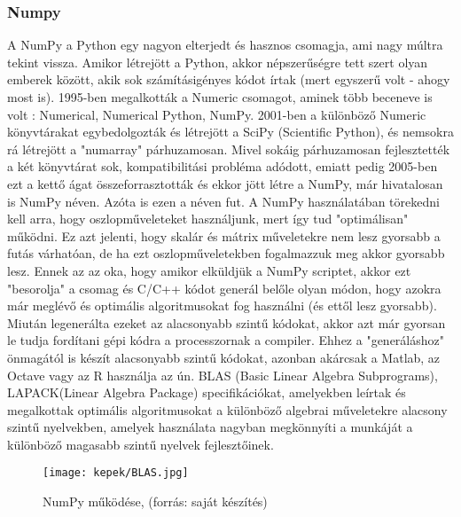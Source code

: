 \documentclass{article}
\theoremstyle{definition}
\theoremstyle{theorem}
\begin{document}
\subsubsection{Numpy}
A NumPy a Python egy nagyon elterjedt és hasznos csomagja, ami nagy múltra tekint vissza. Amikor létrejött a Python, akkor  népszerűségre tett szert olyan emberek között, akik sok számításigényes kódot írtak (mert egyszerű volt - ahogy most is). 1995-ben megalkották a Numeric csomagot, aminek több beceneve is volt : Numerical, Numerical Python, NumPy. 2001-ben a különböző Numeric könyvtárakat egybedolgozták és létrejött a SciPy (Scientific Python), és nemsokra rá létrejött a "numarray" párhuzamosan. Mivel sokáig párhuzamosan fejlesztették a két könyvtárat sok, kompatibilitási probléma adódott, emiatt pedig 2005-ben ezt a kettő ágat összeforrasztották és ekkor jött létre a NumPy, már hivatalosan is NumPy néven. Azóta is ezen a néven fut. A NumPy használatában törekedni kell arra, hogy oszlopműveleteket használjunk, mert így tud "optimálisan" működni. Ez azt jelenti, hogy skalár és mátrix műveletekre nem lesz gyorsabb a futás várhatóan, de ha ezt oszlopműveletekben fogalmazzuk meg akkor gyorsabb lesz. Ennek az az oka, hogy amikor elküldjük a NumPy scriptet, akkor ezt "besorolja" a csomag és C/C++ kódot generál belőle olyan módon, hogy azokra már meglévő és optimális algoritmusokat fog használni (és ettől lesz gyorsabb). Miután legenerálta ezeket az alacsonyabb szintű kódokat, akkor azt már gyorsan le tudja fordítani gépi kódra a processzornak a compiler. Ehhez a "generáláshoz" önmagától is készít alacsonyabb szintű kódokat, azonban akárcsak a Matlab, az Octave vagy az R használja az ún. BLAS (Basic Linear Algebra Subprograms), LAPACK(Linear Algebra Package) specifikációkat, amelyekben leírtak és megalkottak optimális algoritmusokat a különböző algebrai műveletekre alacsony szintű nyelvekben, amelyek használata nagyban megkönnyíti a munkáját a különböző magasabb szintű nyelvek fejlesztőinek.
\begin{figure}[!h]
    \centering
    \texttt{[image: kepek/BLAS.jpg]}
    \caption{NumPy működése, (forrás: saját készítés)}
    \label{Numpy működése}
\end{figure}
\end{document}
